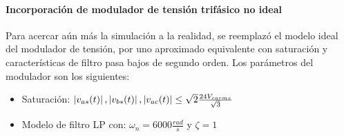 \documentclass[a4paper, 10pt, onecolumn,journal]{ieeeconf}
\begin{document}
\paragraph{\textbf{Incorporación de modulador de tensión trifásico no ideal}} Para acercar aún más la simulación a la realidad, se reemplazó el modelo ideal del modulador de tensión, por uno aproximado equivalente con saturación y características de filtro pasa bajos de segundo orden. Los parámetros del modulador son los siguientes:
\begin{itemize}
	\item Saturación: $\left| v_{as}(t)\right|,\left| v_{bs}(t)\right|,\left| v_{ac}(t)\right| \leq \sqrt{2} \frac{24 V_{ca \space rms}}{\sqrt{3}} $
	\item Modelo de filtro LP con: $\omega_n = 6000 \frac{rad}{s} $ y $\zeta = 1$ 
\end{itemize}
\end{document}
